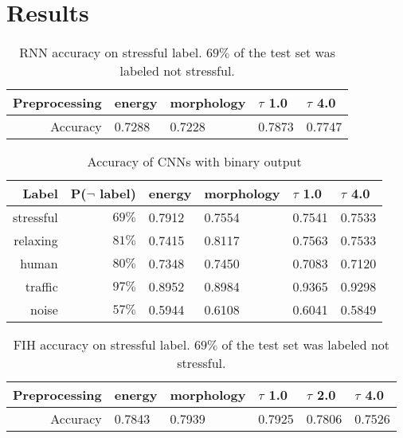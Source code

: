 \section{Results}

\begin{table}
\renewcommand{\arraystretch}{1.3}
\centering
\caption{RNN accuracy on stressful label. $69\%$ of the test set was labeled not stressful.}
\begin{tabular}{r||l|l|l|l}\hline
Preprocessing &energy &morphology & $\tau$ 1.0 & $\tau$ 4.0\\\hline
Accuracy      &0.7288 &0.7228 &0.7873 &0.7747
\end{tabular}
\label{tab:blstmacc}
\end{table}


\begin{table}
\renewcommand{\arraystretch}{1.3}
\centering
\caption{Accuracy of CNNs with binary output}
\begin{tabular}{r|r||l|l|l|l}\hline
Label     & P($\neg$ label) &energy &morphology & $\tau$ 1.0 & $\tau$ 4.0\\\hline
stressful & $69\%$          & 0.7912 & 0.7554 & 0.7541 & 0.7533 \\
relaxing  & $81\%$          & 0.7415 & 0.8117 & 0.7563 & 0.7533 \\
human     & $80\%$          & 0.7348 & 0.7450 & 0.7083 & 0.7120 \\ 
traffic   & $97\%$          & 0.8952 & 0.8984 & 0.9365 & 0.9298 \\
noise     & $57\%$          & 0.5944 & 0.6108 & 0.6041 & 0.5849

\end{tabular}
\label{tab:cnnacc}
\end{table}


\begin{table}
\renewcommand{\arraystretch}{1.3}
\centering
\caption{FIH accuracy on stressful label. $69\%$ of the test set was labeled not stressful.}
\begin{tabular}{r||l|l|l|l}\hline
Preprocessing &energy &morphology & $\tau$ 1.0 & $\tau$ 2.0 & $\tau$ 4.0\\\hline
Accuracy      &0.7843 &0.7939 &0.7925 &0.7806 & 0.7526
\end{tabular}
\label{tab:fihacc}
\end{table}

